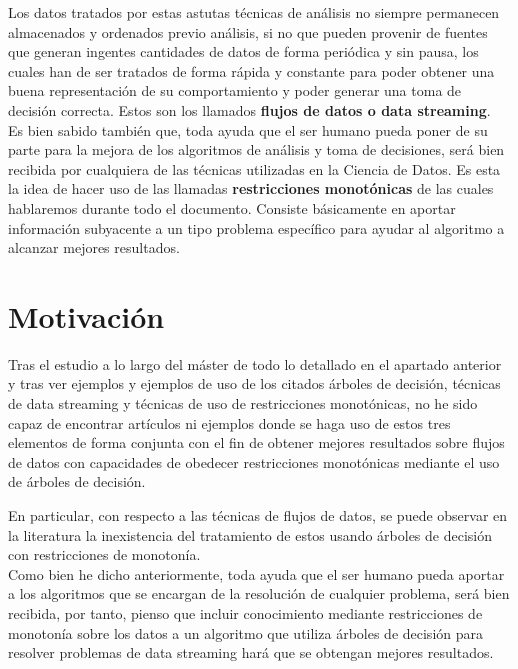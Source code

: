 Los datos tratados por estas astutas técnicas de análisis no siempre permanecen almacenados y ordenados previo análisis, si no que pueden provenir de fuentes que generan ingentes cantidades de datos de forma periódica y sin pausa, los cuales han de ser tratados de forma rápida y constante para poder obtener una buena representación de su comportamiento y poder generar una toma de decisión correcta. Estos son los llamados \textbf{flujos de datos o data streaming}.\\

Es bien sabido también que, toda ayuda que el ser humano pueda poner de su parte para la mejora de los algoritmos de análisis y toma de decisiones, será bien recibida por cualquiera de las técnicas utilizadas en la Ciencia de Datos. Es esta la idea de hacer uso de las llamadas \textbf{restricciones monotónicas} de las cuales hablaremos durante todo el documento. Consiste básicamente en aportar información subyacente a un tipo problema específico para ayudar al algoritmo a alcanzar mejores resultados.

\section{Motivación}

Tras el estudio a lo largo del máster de todo lo detallado en el apartado anterior y tras ver ejemplos y ejemplos de uso de los citados árboles de decisión, técnicas de data streaming y técnicas de uso de restricciones monotónicas, no he sido capaz de encontrar artículos ni ejemplos donde se haga uso de estos tres elementos de forma conjunta con el fin de obtener mejores resultados sobre flujos de datos con capacidades de obedecer restricciones monotónicas mediante el uso de árboles de decisión.

 En particular, con respecto a las técnicas de flujos de datos, se puede observar en la literatura la inexistencia del tratamiento de estos usando árboles de decisión con restricciones de monotonía.\\

Como bien he dicho anteriormente, toda ayuda que el ser humano pueda aportar a los algoritmos que se encargan de la resolución de cualquier problema, será bien recibida, por tanto, pienso que incluir conocimiento mediante restricciones de monotonía sobre los datos a un algoritmo que utiliza árboles de decisión para resolver problemas de data streaming hará que se obtengan mejores resultados.\\\\

